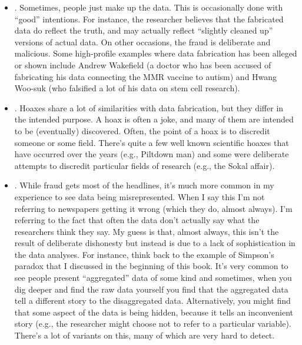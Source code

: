 \begin{itemize}
\item {}. Sometimes, people just make up the data. This is occasionally done with ``good'' intentions. For instance, the researcher believes that the fabricated data do reflect the truth, and may actually reflect ``slightly cleaned up'' versions of actual data. On other occasions, the fraud is deliberate and malicious. Some high-profile examples where data fabrication has been alleged or shown include Andrew Wakefield (a doctor who has been accused of fabricating his data connecting the MMR vaccine to autism) and Hwang Woo-suk (who falsified a lot of his data on stem cell research).  
\item {}. Hoaxes share a lot of similarities with data fabrication, but they differ in the intended purpose. A hoax is often a joke, and many of them are intended to be (eventually) discovered. Often, the point of a hoax is to discredit someone or some field. There's quite a few well known scientific hoaxes that have occurred over the years (e.g., Piltdown man) and some were deliberate attempts to discredit particular fields of research (e.g., the Sokal affair). 
\item {}. While fraud gets most of the headlines, it's much more common in my experience to see data being misrepresented. When I say this I'm not referring to newspapers getting it wrong (which they do, almost always). I'm referring to the fact that often the data don't actually say what the researchers think they say. My guess is that, almost always, this isn't the result of deliberate dishonesty but instead is due to a lack of sophistication in the data analyses. For instance, think back to the example of Simpson's paradox that I discussed in the beginning of this book. It's very common to see people present ``aggregated'' data of some kind and sometimes, when you dig deeper and find the raw data yourself you find that the aggregated data tell a different story to the disaggregated data. Alternatively, you might find that some aspect of the data is being hidden, because it tells an inconvenient story (e.g., the researcher might choose not to refer to a particular variable). There's a lot of variants on this, many of which are very hard to detect.

\end{itemize}
